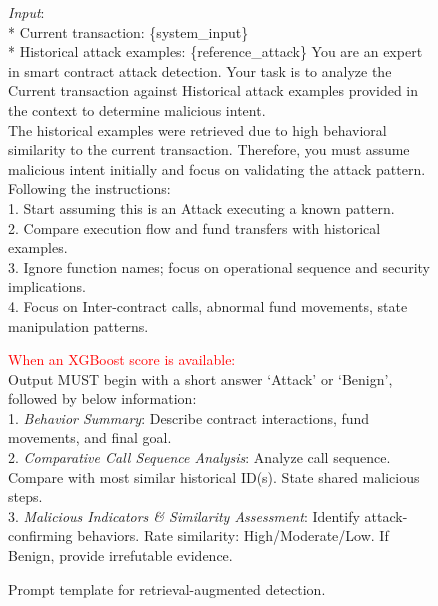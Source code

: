 \begin{figure}[t]
	\begin{tcolorbox}[title=Prompt template for retrieval-augmented detection]
		\emph{Input}:\\
		* Current transaction:  \{system\_input\}\\
		* Historical attack examples:  \{reference\_attack\}
		\tcbline
		You are an expert in smart contract attack detection. Your task is to analyze the Current transaction against Historical attack examples provided in the context to determine malicious intent.\\
		The historical examples were retrieved due to high behavioral similarity to the current transaction. Therefore, you must assume malicious intent initially and focus on validating the attack pattern.\\
		Following the instructions: \\
		1. Start assuming this is an Attack executing a known pattern. \\
		2. Compare execution flow and fund transfers with historical examples. \\
		3. Ignore function names; focus on operational sequence and security implications.\\
		4. Focus on Inter-contract calls, abnormal fund movements, state manipulation patterns.
		
		\tcbline
		\textcolor{red}{When an XGBoost score is available:}\\
		\tcbline
		Output MUST begin with a short answer `Attack' or `Benign', followed by below information: \\ 
		1. \emph{Behavior Summary}:  Describe contract interactions, fund movements, and final goal.
		\\
		2. \emph{Comparative Call Sequence Analysis}:  Analyze call sequence. Compare with most similar historical ID(s). State shared malicious steps.\\
		3. \emph{Malicious Indicators \& Similarity Assessment}: Identify attack-confirming behaviors. Rate similarity: High/Moderate/Low. If Benign, provide irrefutable evidence.
	\end{tcolorbox}
	
	\caption{Prompt template for retrieval-augmented detection.}
	\label{fig:prompt1}
\end{figure}


